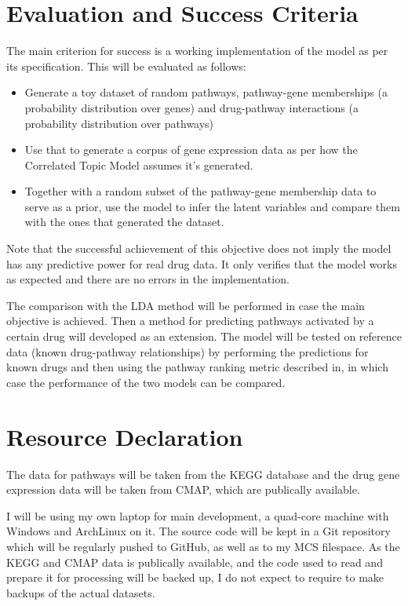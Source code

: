 \documentclass[12pt,a4]{article}
\begin{document}
\section*{Evaluation and Success Criteria}

The main criterion for success is a working implementation of the model as per its specification. This will be evaluated as follows:
\begin{itemize} 
\item Generate a toy dataset of random pathways, pathway-gene memberships (a probability distribution over genes) and drug-pathway interactions (a probability distribution over pathways)
\item Use that to generate a corpus of gene expression data as per how the Correlated Topic Model assumes it's generated.
\item Together with a random subset of the pathway-gene membership data to serve as a prior, use the model to infer the latent variables and compare them with the ones that generated the dataset.
\end{itemize}

Note that the successful achievement of this objective does not imply the model has any predictive power for real drug data. It only verifies that the model works as expected and there are no errors in the implementation.

The comparison with the LDA method will be performed in case the main objective is achieved. Then a method for predicting pathways activated by a certain drug will developed as an extension. The model will be tested on reference data (known drug-pathway relationships) by performing the predictions for known drugs and then using the pathway ranking metric described in\cite{Pratanwanich2014}, in which case the performance of the two models can be compared.

\section*{Resource Declaration}

The data for pathways will be taken from the KEGG\cite{KEGG} database and the drug gene expression data will be taken from CMAP\cite{CMap}, which are publically available.

I will be using my own laptop for main development, a quad-core machine with Windows and ArchLinux on it. The source code will be kept in a Git repository which will be regularly pushed to GitHub, as well as to my MCS filespace. As the KEGG and CMAP data is publically available, and the code used to read and prepare it for processing will be backed up, I do not expect to require to make backups of the actual datasets.
\end{document}
